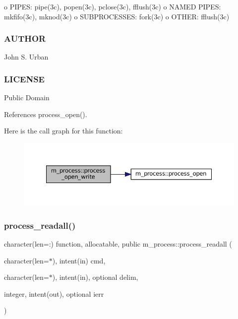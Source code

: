 o P\+I\+P\+ES\+: pipe(3c), popen(3c), pclose(3c), fflush(3c) o N\+A\+M\+ED P\+I\+P\+ES\+: mkfifo(3c), mknod(3c) o S\+U\+B\+P\+R\+O\+C\+E\+S\+S\+ES\+: fork(3c) o O\+T\+H\+ER\+: fflush(3c) \subsubsection*{A\+U\+T\+H\+OR}

John S. Urban \subsubsection*{L\+I\+C\+E\+N\+SE}

Public Domain 

References process\+\_\+open().

Here is the call graph for this function\+:
\nopagebreak
\begin{figure}[H]
\begin{center}
\leavevmode
\includegraphics[width=350pt]{namespacem__process_aa6ed1404ab3472f5068ed15a7a01defc_cgraph}
\end{center}
\end{figure}
\mbox{\label{namespacem__process_a7dd759a1344789477ae1e205d7fa9a51}} 
\subsubsection{\texorpdfstring{process\+\_\+readall()}{process\_readall()}}
{\footnotesize\ttfamily character(len=\+:) function, allocatable, public m\+\_\+process\+::process\+\_\+readall (\begin{DoxyParamCaption}\item[{character(len=$\ast$), intent(in)}]{cmd,  }\item[{character(len=$\ast$), intent(in), optional}]{delim,  }\item[{integer, intent(out), optional}]{ierr }\end{DoxyParamCaption})}



